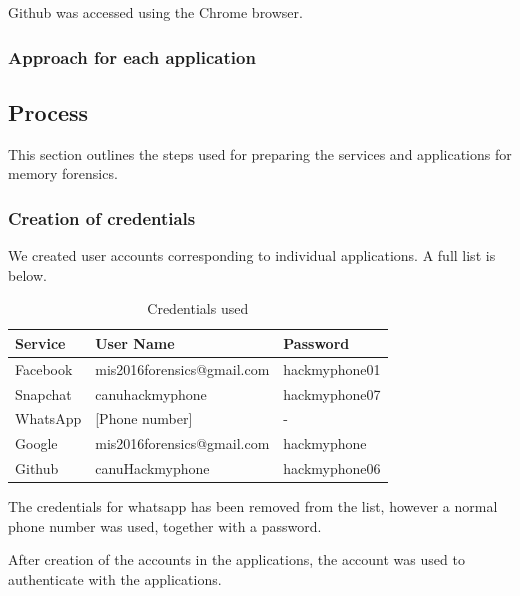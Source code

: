 Github was accessed using the Chrome browser.
\subsubsection*{Approach for each application}
\subsection{Process} %
This section outlines the steps used for preparing the services and applications for memory forensics.

\subsubsection{Creation of credentials}
We created user accounts corresponding to individual applications. A full list is below.\\
\begin{table}
\begin{tabular}{l|l|l}
Service & User Name & Password \\ 
\hline 
Facebook & mis2016forensics@gmail.com & hackmyphone01 \\ 
Snapchat & canuhackmyphone & hackmyphone07 \\ 
WhatsApp & [Phone number] & - \\ 
Google & mis2016forensics@gmail.com & hackmyphone \\ 
Github & canuHackmyphone & hackmyphone06 \\ 
\end{tabular} 
\caption{Credentials used}
\label{tbl:credentials}
\end{table}

The credentials for whatsapp has been removed from the list, however a normal phone number was used, together with a password.

After creation of the accounts in the applications, the account was used to authenticate with the applications.

